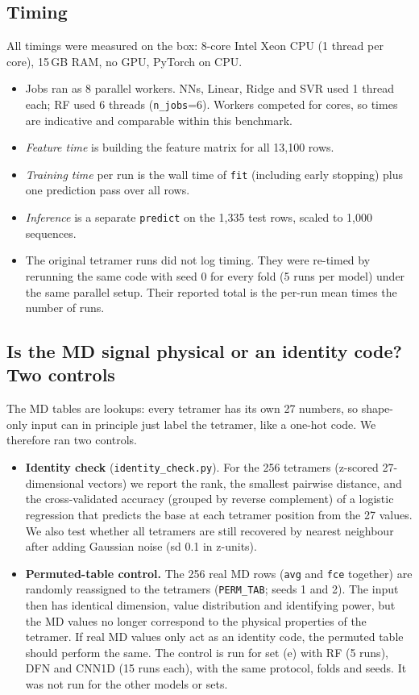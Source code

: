 \subsection{Timing}
All timings were measured on the box: 8-core Intel Xeon CPU (1 thread per core), 15\,GB RAM, no GPU, PyTorch on CPU.
\begin{itemize}
\item Jobs ran as 8 parallel workers. NNs, Linear, Ridge and SVR used 1 thread each; RF used 6 threads (\texttt{n\_jobs}=6). Workers competed for cores, so times are indicative and comparable within this benchmark.
\item \emph{Feature time} is building the feature matrix for all 13{,}100 rows.
\item \emph{Training time} per run is the wall time of \texttt{fit} (including early stopping) plus one prediction pass over all rows.
\item \emph{Inference} is a separate \texttt{predict} on the 1{,}335 test rows, scaled to 1{,}000 sequences.
\item The original tetramer runs did not log timing. They were re-timed by rerunning the same code with seed 0 for every fold (5 runs per model) under the same parallel setup. Their reported total is the per-run mean times the number of runs.
\end{itemize}


\subsection{Is the MD signal physical or an identity code? Two controls}\label{sec:controls}
The MD tables are lookups: every tetramer has its own 27 numbers, so shape-only input can in principle just label the tetramer, like a one-hot code. We therefore ran two controls.
\begin{itemize}
\item \textbf{Identity check} (\texttt{identity\_check.py}). For the 256 tetramers (z-scored 27-dimensional vectors) we report the rank, the smallest pairwise distance, and the cross-validated accuracy (grouped by reverse complement) of a logistic regression that predicts the base at each tetramer position from the 27 values. We also test whether all tetramers are still recovered by nearest neighbour after adding Gaussian noise (sd 0.1 in z-units).
\item \textbf{Permuted-table control.} The 256 real MD rows (\texttt{avg} and \texttt{fce} together) are randomly reassigned to the tetramers (\texttt{PERM\_TAB}; seeds 1 and 2). The input then has identical dimension, value distribution and identifying power, but the MD values no longer correspond to the physical properties of the tetramer. If real MD values only act as an identity code, the permuted table should perform the same. The control is run for set (e) with RF (5 runs), DFN and CNN1D (15 runs each), with the same protocol, folds and seeds. It was not run for the other models or sets.
\end{itemize}
